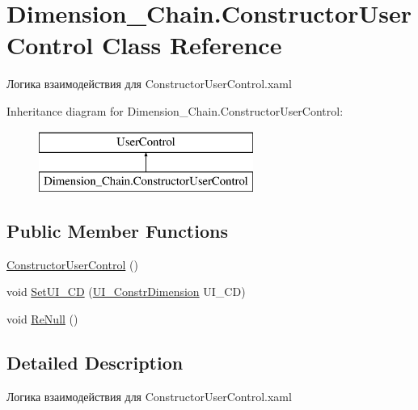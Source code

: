 \hypertarget{class_dimension___chain_1_1_constructor_user_control}{}\section{Dimension\+\_\+\+Chain.\+Constructor\+User\+Control Class Reference}
\label{class_dimension___chain_1_1_constructor_user_control}


Логика взаимодействия для Constructor\+User\+Control.\+xaml  


Inheritance diagram for Dimension\+\_\+\+Chain.\+Constructor\+User\+Control\+:\begin{figure}[H]
\begin{center}
\leavevmode
\includegraphics[height=2.000000cm]{class_dimension___chain_1_1_constructor_user_control}
\end{center}
\end{figure}
\subsection*{Public Member Functions}
\begin{DoxyCompactItemize}
\item 
\mbox{\hyperlink{class_dimension___chain_1_1_constructor_user_control_a2f3c1d13b26dcbe5a8e073c0c7ff6b37}{Constructor\+User\+Control}} ()
\item 
void \mbox{\hyperlink{class_dimension___chain_1_1_constructor_user_control_afef7cae9b0adc5fb1bfd6b5973c2fbc0}{Set\+U\+I\+\_\+\+CD}} (\mbox{\hyperlink{class_dimension___chain_1_1_u_i___constr_dimension}{U\+I\+\_\+\+Constr\+Dimension}} U\+I\+\_\+\+CD)
\item 
void \mbox{\hyperlink{class_dimension___chain_1_1_constructor_user_control_a4d13a15d714e5a5d84f3a9118daa42c7}{Re\+Null}} ()
\end{DoxyCompactItemize}


\subsection{Detailed Description}
Логика взаимодействия для Constructor\+User\+Control.\+xaml 



